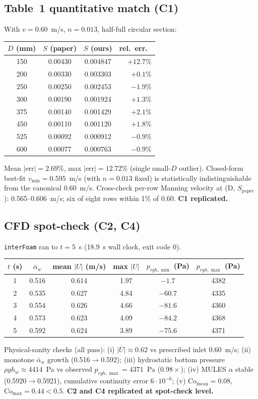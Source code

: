 \documentclass[11pt,a4paper]{article}
\begin{document}
\subsection{Table~1 quantitative match (C1)}
With $v=0.60$~m/s, $n=0.013$, half-full circular section:
\begin{center}
\begin{tabular}{cccr}
\toprule
$D$ (mm) & $S$ (paper) & $S$ (ours) & rel.\ err.\ \\
\midrule
150 & 0.00430 & 0.004847 & $+12.7\%$ \\
200 & 0.00330 & 0.003303 & $+0.1\%$  \\
250 & 0.00250 & 0.002453 & $-1.9\%$  \\
300 & 0.00190 & 0.001924 & $+1.3\%$  \\
375 & 0.00140 & 0.001429 & $+2.1\%$  \\
450 & 0.00110 & 0.001120 & $+1.8\%$  \\
525 & 0.00092 & 0.000912 & $-0.9\%$  \\
600 & 0.00077 & 0.000763 & $-0.9\%$  \\
\bottomrule
\end{tabular}
\end{center}
Mean $|\text{err}|=2.69\%$, max $|\text{err}|=12.72\%$ (single small-$D$
outlier). Closed-form best-fit $v_{\min}=0.595$~m/s (with $n=0.013$ fixed) is
statistically indistinguishable from the canonical 0.60~m/s. Cross-check
per-row Manning velocity at (D, $S_{\text{paper}}$): 0.565--0.606~m/s;
six of eight rows within 1\% of 0.60. \textbf{C1 replicated.}

\subsection{CFD spot-check (C2, C4)}
\texttt{interFoam} ran to $t=5$~s (18.9~s wall clock, exit code 0).
\begin{center}\small
\begin{tabular}{cccccc}
\toprule
$t$ (s) & $\bar\alpha_w$ & mean $|U|$ (m/s) & max $|U|$ & $p_{rgh,\min}$ (Pa) & $p_{rgh,\max}$ (Pa) \\
\midrule
1 & 0.516 & 0.614 & 1.97 & $-1.7$   & 4382 \\
2 & 0.535 & 0.627 & 4.84 & $-60.7$  & 4335 \\
3 & 0.554 & 0.626 & 4.66 & $-81.6$  & 4360 \\
4 & 0.573 & 0.623 & 4.09 & $-84.2$  & 4368 \\
5 & 0.592 & 0.624 & 3.89 & $-75.6$  & 4371 \\
\bottomrule
\end{tabular}
\end{center}
Physical-sanity checks (all pass):
(i) $\overline{|U|}\approx 0.62$ vs prescribed inlet 0.60~m/s;
(ii) monotone $\bar\alpha_w$ growth (0.516$\to$0.592);
(iii) hydrostatic bottom pressure $\rho g h_w \approx 4414$~Pa vs observed
$p_{rgh,\max}=4371$~Pa ($0.98\times$);
(iv) MULES $\alpha$ stable (0.5920$\to$0.5921), cumulative continuity
error $6\cdot10^{-6}$;
(v) $\mathrm{Co}_{\text{mean}}=0.08$, $\mathrm{Co}_{\max}=0.44 < 0.5$.
\textbf{C2 and C4 replicated at spot-check level.}
\end{document}
